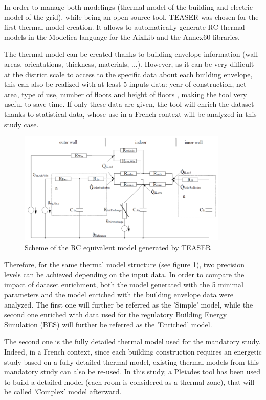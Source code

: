 \documentclass[buildings,article,submit,moreauthors,pdftex,10pt,a4paper]{mdpi}
\theoremstyle{mdpi}
\newcounter{ex}
\newcounter{re}
\theoremstyle{mdpidefinition}
\begin{document}
In order to manage both modelings (thermal model of the building and electric model of the grid), while being an open-source tool, TEASER \cite{fuchs_workflow_2016} was chosen for the first thermal model creation. It allows to automatically generate RC thermal models in the Modelica language for the AixLib \cite{noauthor_aixlib:_2018} and the Annex60 \cite{noauthor_modelica-ibpsa:_2018} libraries.

The thermal model can be created thanks to building envelope information (wall areas, orientations, thickness, materials, ...). However, as it can be very difficult at the district scale to access to the specific data about each building envelope, this can also be realized with at least 5 inputs data: year of construction, net area, type of use, number of floors and height of floors \cite{fuchs_workflow_2016}, making the tool very useful to save time. If only these data are given, the tool will enrich the dataset thanks to statistical data, whose use in a French context will be analyzed in this study case.

\begin{figure}[H]
	\centering
    \includegraphics[width=10cm]{RC_model.png}
    \caption{Scheme of the RC equivalent model generated by TEASER}
    \label{RC_model_TEASER}
\end{figure}

Therefore, for the same thermal model structure (see figure \ref{RC_model_TEASER}), two precision levels can be achieved depending on the input data. In order to compare the impact of dataset enrichment, both the model generated with the 5 minimal parameters and the model enriched with the building envelope data were analyzed. The first one will further be referred as the 'Simple' model, while the second one enriched with data used for the regulatory Building Energy Simulation (BES) will further be referred as the 'Enriched' model.

The second one is the fully detailed thermal model used for the mandatory study. Indeed, in a French context, since each building construction requires an energetic study based on a fully detailed thermal model, existing thermal models from this mandatory study can also be re-used.
In this study, a Pleiades tool \cite{pleiades} has been used to build a detailed model (each room is considered as a thermal zone), that will be called 'Complex' model afterward.
\end{document}
